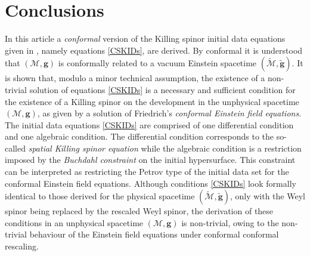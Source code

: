 \documentclass[10pt,a4paper]{article}
\theoremstyle{plain}
\def\bmg{{\bm g}}
\begin{document}
\section*{Conclusions}

In this article a \emph{conformal} version of the Killing spinor
initial data equations given in \cite{GarVal08c}, namely equations \eqref{CSKIDs}, are derived. By
conformal it is understood that $(\mathcal{M},\bmg)$ is conformally
related to a vacuum Einstein spacetime $(\tilde{\mathcal{M}},\tilde{\bmg})$.
It is shown that, modulo a minor technical assumption, the existence of a non-trivial solution of equations
\eqref{CSKIDs} is a necessary and sufficient
condition for the existence of a Killing spinor on the development in
the unphysical spacetime $(\mathcal{M},\bmg)$, as given by a solution of Friedrich's
\emph{conformal Einstein field equations}.
  The initial data equations \eqref{CSKIDs} are comprised of one differential condition and one
  algebraic condition.  The differential condition corresponds to the
  so-called \emph{spatial Killing spinor equation} while the algebraic
  condition is a restriction imposed by the \emph{Buchdahl constraint} on the initial
  hypersurface. This constraint can be interpreted as restricting the Petrov type
  of the initial data set for the conformal Einstein field equations.
  Although conditions \eqref{CSKIDs} look formally
  identical to those derived for the physical spacetime
  $(\tilde{\mathcal{M}},\tilde{\bmg})$, only with the Weyl spinor being replaced by the rescaled Weyl spinor, the derivation of these
  conditions in an unphysical spacetime
  $(\mathcal{M},\bmg)$ is non-trivial, owing to the non-trivial behaviour of the Einstein field equations under conformal conformal rescaling.  
  \medskip
\end{document}

